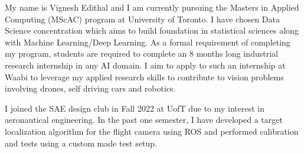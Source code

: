 \documentclass{resume}
\begin{document}
My name is Vignesh Edithal and I am currently pursuing the Masters in Applied Computing (MScAC) program at University of Toronto.
I have chosen Data Science concentration which aims to build foundation in statistical sciences along with Machine Learning/Deep Learning.
As a formal requirement of completing my program, students are required to complete an 8 months long industrial research internship in any AI domain.
I aim to apply to such an internship at Waabi to leverage my applied research skills to contribute to vision problems involving drones, self driving cars and robotics.

I joined the SAE design club in Fall 2022 at UofT due to my interest in aeronautical engineering.
In the past one semester, I have developed a target localization algorithm for the flight camera using ROS and performed calibration and tests using a custom made test setup.
\end{document}
